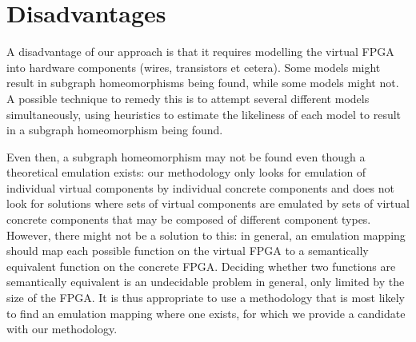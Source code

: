 \section{Disadvantages}

A disadvantage of our approach is that it requires modelling the virtual FPGA into hardware components (wires, transistors et cetera). Some models might result in subgraph homeomorphisms being found, while some models might not. A possible technique to remedy this is to attempt several different models simultaneously, using heuristics to estimate the likeliness of each model to result in a subgraph homeomorphism being found.

Even then, a subgraph homeomorphism may not be found even though a theoretical emulation exists: our methodology only looks for emulation of individual virtual components by individual concrete components and does not look for solutions where sets of virtual components are emulated by sets of virtual concrete components that may be composed of different component types. However, there might not be a solution to this: in general, an emulation mapping should map each possible function on the virtual FPGA to a semantically equivalent function on the concrete FPGA. Deciding whether two functions are semantically equivalent is an undecidable problem in general, only limited by the size of the FPGA. It is thus appropriate to use a methodology that is most likely to find an emulation mapping where one exists, for which we provide a candidate with our methodology.